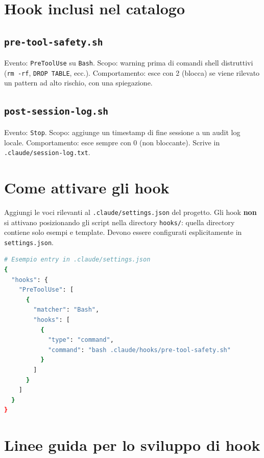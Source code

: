 \documentclass[12pt,a4paper,twoside]{book}
\begin{document}
\section{Hook inclusi nel catalogo}

\subsection{\texttt{pre-tool-safety.sh}}

Evento: \texttt{PreToolUse} su \texttt{Bash}. Scopo: warning prima di comandi shell distruttivi (\texttt{rm -rf}, \texttt{DROP TABLE}, ecc.). Comportamento: esce con 2 (blocca) se viene rilevato un pattern ad alto rischio, con una spiegazione.

\subsection{\texttt{post-session-log.sh}}

Evento: \texttt{Stop}. Scopo: aggiunge un timestamp di fine sessione a un audit log locale. Comportamento: esce sempre con 0 (non bloccante). Scrive in \texttt{.claude/session-log.txt}.

\section{Come attivare gli hook}

Aggiungi le voci rilevanti al \texttt{.claude/settings.json} del progetto. Gli hook \textbf{non} si attivano posizionando gli script nella directory \texttt{hooks/}: quella directory contiene solo esempi e template. Devono essere configurati esplicitamente in \texttt{settings.json}.

\begin{lstlisting}[language=bash]
# Esempio entry in .claude/settings.json
{
  "hooks": {
    "PreToolUse": [
      {
        "matcher": "Bash",
        "hooks": [
          {
            "type": "command",
            "command": "bash .claude/hooks/pre-tool-safety.sh"
          }
        ]
      }
    ]
  }
}
\end{lstlisting}

\section{Linee guida per lo sviluppo di hook}
\end{document}
